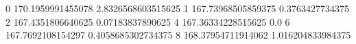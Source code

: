 0 170.1959991455078 2.8326568603515625
1 167.73968505859375 0.3763427734375
2 167.4351806640625 0.07183837890625
4 167.36334228515625 0.0
6 167.7692108154297 0.4058685302734375
8 168.37954711914062 1.016204833984375
